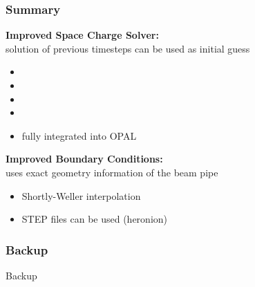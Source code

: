 \documentclass[xcolor=pdftex,table,10pt]{beamer}
\begin{document}
     	\begin{frame}
		\frametitle{Summary}

		\textbf{Improved Space Charge Solver:} \\
		solution of previous timesteps can be used as initial guess

		\begin{itemize}
			\item \color{green}{is discretized with finite differences}
			\item \color{green}{is solved with a multi-level preconditioned CG}
			\item \color{green}{anisotropies can be handled}
			\item \color{green}{uses smoothed aggregation}
			\item \alert{fully integrated into OPAL}
		\end{itemize}

		\vspace{0.4cm}

		\textbf{Improved Boundary Conditions:} \\
		uses exact geometry information of the beam pipe

		\begin{itemize}
			\item \alert{Shortly-Weller interpolation}
			\item \alert{STEP files can be used (heronion)}
		\end{itemize}

	\end{frame}
 
	
	\begin{frame}
	  	\frametitle{Backup}
		\begin{center}
			\LARGE{Backup}
		\end{center}
	\end{frame}
	
\end{document}
